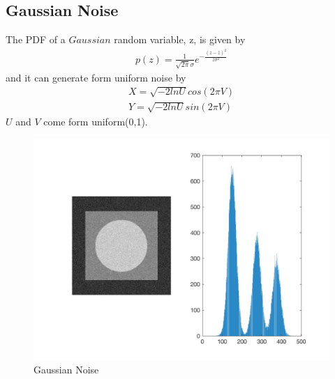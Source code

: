 \documentclass[11pt,oneside]{book}
\begin{document}
\subsection{Gaussian Noise}
The PDF of a $Gaussian$ random variable, z, is given by\\
\begin{align}
p(z) = \frac{1}{\sqrt{2\pi}\sigma}e^{-\frac{(z-\overline z)^2}{z\sigma ^2}}
\end{align}
and it can generate form uniform noise by\\
\begin{align}
X = \sqrt{-2lnU}cos(2\pi V)\\
Y = \sqrt{-2lnU}sin(2\pi V)
\end{align}
$U$ and $V$ come form uniform(0,1).
\begin{figure}[!htb]
   \centering  
   \includegraphics[width=1.0\textwidth]{images/4/gaussian.jpg}
   \caption{Gaussian Noise}  
\end{figure}
\newpage
\end{document}
